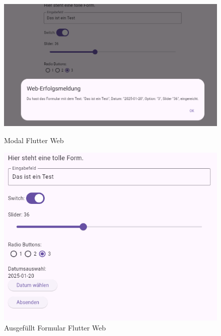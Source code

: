 \begin{figure}[H]
    \vspace{0.5cm}

    \begin{minipage}{0.45\textwidth}
        \centering
        \includegraphics[width=\linewidth]{images/form/web/flutter/modal.png}
        \caption{Modal Flutter Web}
    \end{minipage}
    \hfill
    \begin{minipage}{0.45\textwidth}
        \centering
        \includegraphics[width=\linewidth]{images/form/web/flutter/formCompleted.png}
        \caption{Ausgefüllt Formular Flutter Web}
    \end{minipage}
\end{figure}

